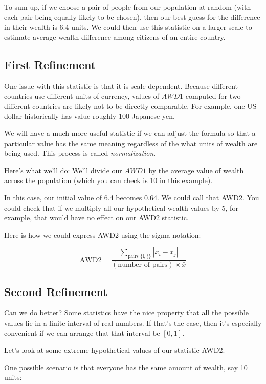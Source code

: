 \documentclass[12pt]{memoir}\usepackage[]{graphicx}\usepackage[table]{xcolor}
\begin{document}
To sum up, if we choose a pair of people from our population at random (with each 
pair being equally likely to be chosen), then our best guess for the difference in 
their wealth is 6.4 units.  We could then use this statistic on a larger scale to estimate
average wealth difference among citizens of an entire country.  

\subsection*{First Refinement}

One issue with this statistic is that it is scale dependent.  Because different countries
use different units of currency, values of $AWD1$ computed for two different countries are
likely not to be directly comparable.  For example, one US dollar historically has value
roughly 100 Japanese yen. 

We will have a much more useful statistic if we can adjust the formula so that 
a particular value has the same meaning regardless of the what units of wealth are 
being used.  This process is called \emph{normalization}. 

Here's what we'll do:  We'll divide our $AWD1$ by the average value of wealth
across the population (which you can check is 10 in this example).

In this case, our initial value of 6.4 becomes 0.64.  We could call that 
AWD2.  You could check that if we multiply all our hypothetical wealth 
values by 5, for example, that would have no effect on our AWD2 statistic.  

Here is how we could express AWD2 using the sigma notation: 

$$\text{AWD2} = \dfrac{\displaystyle\sum_{\text{pairs \{i, j\}}} |x_i - x_j|}{(\text{number of pairs})\times \bar{x}}$$

\subsection*{Second Refinement}

Can we do better?  Some statistics have the nice property that all the possible
values lie in a finite interval of real numbers.  If that's the case, then it's 
especially convenient if we can arrange that that interval be $[0, 1]$. 

Let's look at some extreme hypothetical values of our statistic AWD2.  

One possible scenario is that everyone has the same amount of wealth, say 10 units: 
\end{document}
